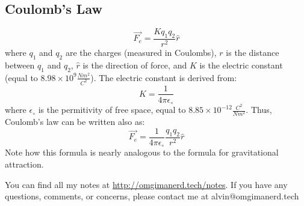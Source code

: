 \documentclass{math}
\begin{document}
\subsection*{Coulomb's Law}
\[ \vec{F_e} = \frac{Kq_1q_2}{r^2}\hat{r} \]
where \( q_1 \) and \( q_2 \) are the charges (measured in Coulombs), \( r \)
is the distance between \( q_1 \) and \( q_2 \), \( \hat{r} \) is the direction
of force, and \( K \) is the electric constant (equal to \( 8.98\times10^9
\frac{Nm^2}{C^2} \)). The electric constant is derived from:
\[ K = \frac{1}{4\pi\epsilon_{\circ}} \]
where \( \epsilon_{\circ} \) is the permitivity of free space, equal to
\( 8.85\times10^{-12}\frac{C^2}{Nm^2} \). Thus, Coulomb's law can be written
also as:
\[ \vec{F_e} = \frac{1}{4\pi\epsilon_{\circ}}\frac{q_1q_2}{r^2}\hat{r} \]
Note how this formula is nearly analogous to the formula for gravitational
attraction.

\begin{center}
  You can find all my notes at \url{http://omgimanerd.tech/notes}. If you have
  any questions, comments, or concerns, please contact me at
  alvin@omgimanerd.tech
\end{center}
\end{document}
